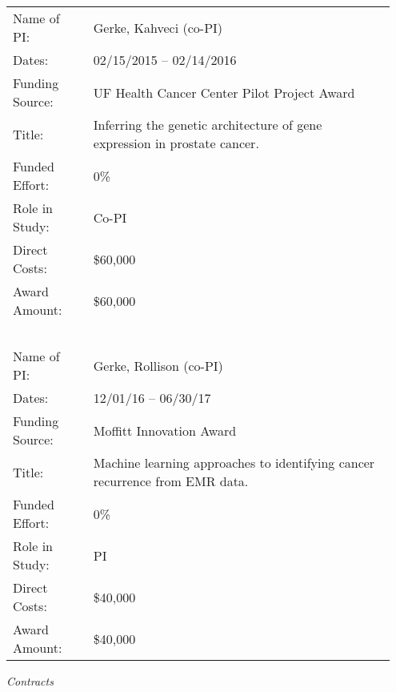 \documentclass[11pt, a4paper]{article} %
\begin{document}
\begin{longtable}{@{}p{0.2\linewidth} p{0.75\linewidth}}
Name of PI: & Gerke, Kahveci (co-PI) \\
Dates: & 02/15/2015 -- 02/14/2016\\
Funding Source: & UF Health Cancer Center Pilot Project Award\\
Title: & Inferring the genetic architecture of gene expression in prostate cancer.\\
Funded Effort: & 0\%\\
Role in Study: & Co-PI \\
Direct Costs: & \$60,000\\
Award Amount: & \$60,000\\
~\\
Name of PI: & Gerke, Rollison (co-PI) \\
Dates: &  12/01/16 -- 06/30/17\\
Funding Source: & Moffitt Innovation Award\\
Title: & Machine learning approaches to identifying cancer recurrence from EMR data.\\
Funded Effort: & 0\%\\
Role in Study: & PI \\
Direct Costs: & \$40,000\\
Award Amount: & \$40,000\\
\end{longtable}

\emph{Contracts}
\end{document}

